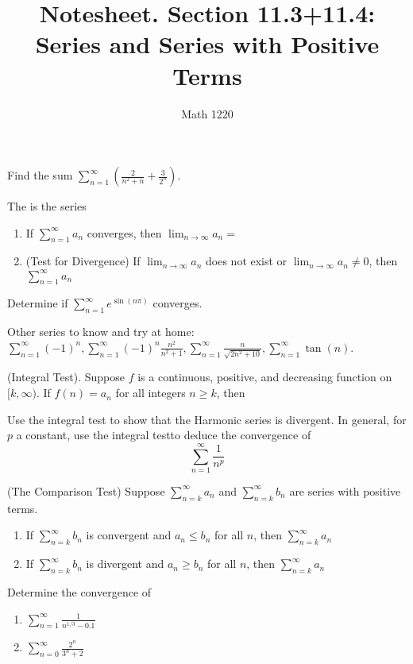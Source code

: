 \documentclass[12pt, a4paper]{article}
\author{Math 1220}
\title{Notesheet. Section 11.3+11.4: Series and Series with Positive Terms}
\date{}
\begin{document}
\maketitle
\nameline
\begin{ex}
  Find the sum \(\sum_{n=1}^\infty \left( \frac{2}{n^2+n} +
    \frac{3}{2^n} \right)\).
\end{ex}
\begin{defi}
  The  is the series
\end{defi}
\begin{thrm}
  \begin{enumerate}
  \item If \(\sum_{n=1}^\infty a_n\) converges, then \(\lim_{n \to
      \infty} a_n = \)
  \item (Test for Divergence) If \(\lim_{n \to \infty} a_n\) does not exist or \(\lim_{n \to
    \infty} a_n \neq 0\), then \(\sum_{n=1}^\infty a_n\)
  \end{enumerate}
\end{thrm}
\begin{ex}
  Determine if \(\sum_{n=1}^\infty e^{\sin(n\pi)}\) converges.
\end{ex}
Other series to know and try at home: \(\sum_{n=1}^\infty (-1)^n,
\sum_{n=1}^\infty (-1)^n \frac{n^2}{n^2+1}, \sum_{n=1}^\infty
\frac{n}{\sqrt{2n^2+10}}, \sum_{n=1}^\infty \tan(n)\).
\begin{thrm}
  (Integral Test). Suppose \(f\) is a continuous, positive, and decreasing function on
  \([k,\infty)\). If \(f(n) = a_n\) for all integers \(n \geq k\), then 
\end{thrm}
\begin{ex}
  Use the integral test to show that the Harmonic series is
  divergent. In general, for \(p\) a constant, use the integral
  testto deduce the 
  convergence of  \[
    \sum_{n=1}^\infty \frac{1}{n^p}
  \]
\end{ex}
\begin{thrm}
  (The Comparison Test) Suppose \(\sum_{n=k}^\infty a_n\) and
  \(\sum_{n=k}^\infty b_n\) are series with positive terms.
  \begin{enumerate}
  \item If \(\sum_{n=k}^\infty b_n\) is convergent and \(a_n \leq
    b_n\) for all \(n\), then \(\sum_{n=k}^\infty a_n\)
  \item If \(\sum_{n=k}^\infty b_n\) is divergent and \(a_n \geq b_n\)
    for all \(n\), then \(\sum_{n=k}^\infty a_n\)
  \end{enumerate}
\end{thrm}
\begin{ex}
  Determine the convergence of
  \begin{enumerate}
  \item \(\sum_{n=1}^\infty \frac{1}{n^{1/3}-0.1}\)
  \item \(\sum_{n=0}^\infty \frac{2^n}{3^n + 2}\)
  \end{enumerate}
\end{ex}
\end{document}
